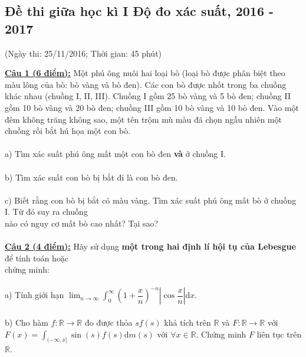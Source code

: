 \documentclass[10pt, a4paper]{article}
\begin{document}
\subsection{Đề thi giữa học kì I Độ đo xác suất, 2016 - 2017}
\begin{center}
	\color{blue}(Ngày thi: 25/11/2016; Thời gian: 45 phút)
\end{center}
\color{red}\underline{\textbf{Câu 1 (6 điểm):}} \color{black}Một phú ông nuôi hai loại bò (loại bò được phân biệt theo màu lông của bò: bò vàng và bò đen). Các con bò được nhốt trong ba chuồng khác nhau (chuồng I, II, III). Chuồng I gồm 25 bò vàng và 5 bò đen; chuồng II gồm 10 bò vàng và 20 bò đen; chuồng III gồm 10 bò vàng và 10 bò đen. Vào một đêm không trăng không sao, một tên trộm mù màu đã chọn ngẫu nhiên một chuồng rồi bắt hú họa một con bò.\\\\
\color{red}a) \color{black}Tìm xác suất phú ông mất một con bò đen \textbf{và }ở chuồng I.\\\\
\color{red}b) \color{black}Tìm xác suất con bò bị bắt đi là con bò đen.\\\\
\color{red}c) \color{black}Biết rằng con bò bị bắt có màu vàng. Tìm xác suất phú ông mất bò ở chuồng I. Từ đó suy ra chuồng\\ nào có nguy cơ mất bò cao nhất? Tại sao?\\\\
\color{red}\underline{\textbf{Câu 2 (4 điểm):}} \color{black}Hãy sử dụng \textbf{một trong hai định lí hội tụ của Lebesgue }để tính toán hoặc\\ chứng minh:\\\\
\color{red}a) \color{black}Tính giới hạn $\displaystyle\lim_{n\rightarrow\infty}\displaystyle\int_0^\infty\left(1+\dfrac xn\right)^{-n}\left|\cos\dfrac xn\right|\text{d}x$.\\\\
\color{red}b) \color{black}Cho hàm $f:\mathbb R\rightarrow\mathbb R$ đo được thỏa $sf(s)$ khả tích trên $\mathbb R$ và $F:\mathbb R\rightarrow\mathbb R$ với $F(x)=\displaystyle\int_{(-\infty,x]}\sin(s)f(s)\text{d}m(s)$ với $\forall x\in\mathbb R$. Chứng minh $F$ liên tục trên $\mathbb R$.

\newpage
\end{document}
